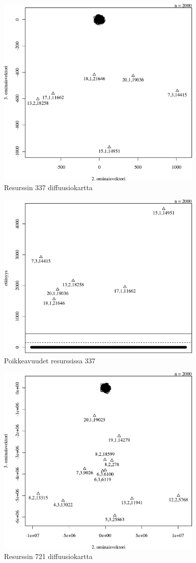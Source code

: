 \begin{figure}[p]
\centering
\includegraphics[width=10cm]{pics/diffuusiokuvat/service_337.pdf}
\caption{Resurssin 337 diffuusiokartta}
\label{diffusio_337}
\end{figure}

\begin{figure}[p]
\centering
\includegraphics[width=10cm]{pics/tiheyskuvat/service_337.pdf}
\caption{Poikkeavuudet resurssissa 337}
\label{service_337}
\end{figure}

\begin{figure}[p]
\centering
\includegraphics[width=10cm]{pics/diffuusiokuvat/service_721.pdf}
\caption{Resurssin 721 diffuusiokartta}
\label{diffusio_721}
\end{figure}


